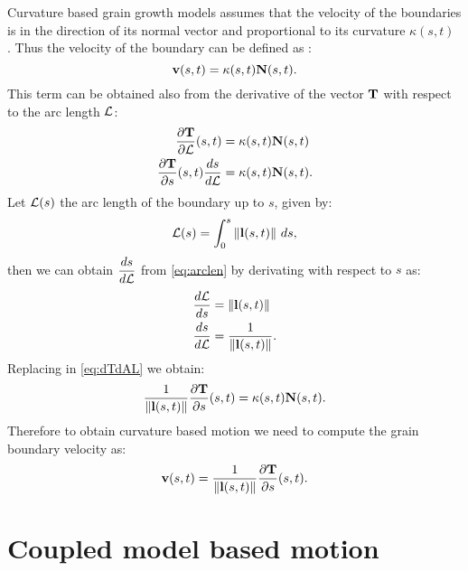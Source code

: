 Curvature based grain growth models assumes that the velocity of the boundaries is in the direction of its normal vector and proportional to its curvature $\kappa(s,t)$ \cite{Kinderlehrer2006}. Thus the velocity of the boundary can be defined as \cite{thomascalculus}:
\begin{equation}
    \vel(s,t) = \kappa(s,t)\N(s,t). %
    \nonumber
\end{equation}
This term can be obtained also from the derivative of the vector $\mathbf{T}$ with respect to the arc length $\mathcal{L}$:
\begin{align}
    \dfrac{\partial \mathbf{T}}{\partial \mathcal{L}}(s,t)  &= \kappa(s,t)\mathbf{N}(s,t) \nonumber\\
    \dfrac{\partial \mathbf{T}}{\partial s}(s,t) \dfrac{ds}{d\mathcal{L}} &=\kappa(s,t)\mathbf{N}(s,t). \label{eq:dTdAL}
\end{align}
Let $\mathcal{L}(s)$ the arc length of the boundary up to $s$, given by:
\begin{equation}
    \mathcal{L}(s) = \int_0^{s} \left\lVert\mathbf{l}(s,t)\right\rVert\, ds,
    \label{eq:arclen}
\end{equation}
then we can obtain $\dfrac{ds}{d\mathcal{L}}$ from \eqref{eq:arclen} by derivating with respect to $s$ as:
\begin{align*}
    \frac{d\mathcal{L}}{ds} &= \left\lVert\mathbf{l}(s,t)\right\rVert \\
    \frac{ds}{d\mathcal{L}} &= \frac{1}{\left\lVert\mathbf{l}(s,t)\right\rVert}.
\end{align*}
Replacing in \eqref{eq:dTdAL} we obtain:
\begin{equation}
    \dfrac{1}{\left\lVert\mathbf{l}(s,t)\right\rVert} \dfrac{\partial \mathbf{T}}{\partial s}(s,t) = \kappa(s,t)\mathbf{N}(s,t).
    \label{eq:curvresult}
\end{equation}
Therefore to obtain curvature based motion we need to compute the grain boundary velocity as:
\begin{equation} \mathbf{v}(s,t) = \frac{1}{\left\lVert\mathbf{l}(s,t)\right\rVert}\dfrac{\partial \mathbf{T}}{\partial s}(s,t). \label{eq:curvvelocity}
\end{equation}

\section{Coupled model based motion}

